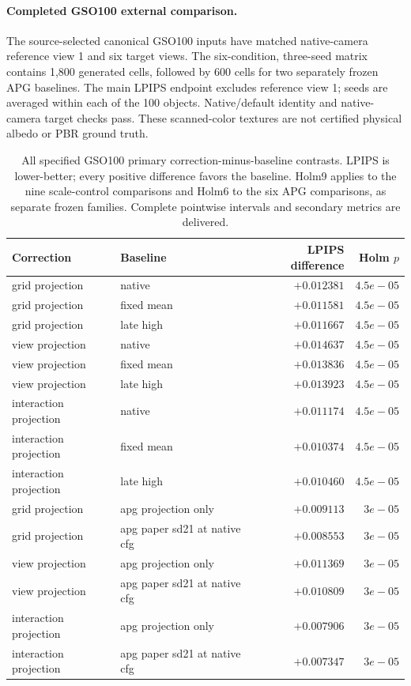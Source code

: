 \paragraph{Completed GSO100 external comparison.}
The source-selected canonical GSO100 inputs have matched native-camera reference view 1 and six target views. The six-condition, three-seed matrix contains 1,800 generated cells, followed by 600 cells for two separately frozen APG baselines. The main LPIPS endpoint excludes reference view 1; seeds are averaged within each of the 100 objects. Native/default identity and native-camera target checks pass. These scanned-color textures are not certified physical albedo or PBR ground truth.

\begin{table}[ht]\centering\small
\begin{tabular}{llrr}
\toprule
Correction & Baseline & LPIPS difference & Holm $p$ \\
\midrule
grid projection & native & $+0.012381$ & $4.5e-05$ \\
grid projection & fixed mean & $+0.011581$ & $4.5e-05$ \\
grid projection & late high & $+0.011667$ & $4.5e-05$ \\
view projection & native & $+0.014637$ & $4.5e-05$ \\
view projection & fixed mean & $+0.013836$ & $4.5e-05$ \\
view projection & late high & $+0.013923$ & $4.5e-05$ \\
interaction projection & native & $+0.011174$ & $4.5e-05$ \\
interaction projection & fixed mean & $+0.010374$ & $4.5e-05$ \\
interaction projection & late high & $+0.010460$ & $4.5e-05$ \\
grid projection & apg projection only & $+0.009113$ & $3e-05$ \\
grid projection & apg paper sd21 at native cfg & $+0.008553$ & $3e-05$ \\
view projection & apg projection only & $+0.011369$ & $3e-05$ \\
view projection & apg paper sd21 at native cfg & $+0.010809$ & $3e-05$ \\
interaction projection & apg projection only & $+0.007906$ & $3e-05$ \\
interaction projection & apg paper sd21 at native cfg & $+0.007347$ & $3e-05$ \\
\bottomrule\end{tabular}
\caption{All specified GSO100 primary correction-minus-baseline contrasts. LPIPS is lower-better; every positive difference favors the baseline. Holm9 applies to the nine scale-control comparisons and Holm6 to the six APG comparisons, as separate frozen families. Complete pointwise intervals and secondary metrics are delivered.}
\end{table}

